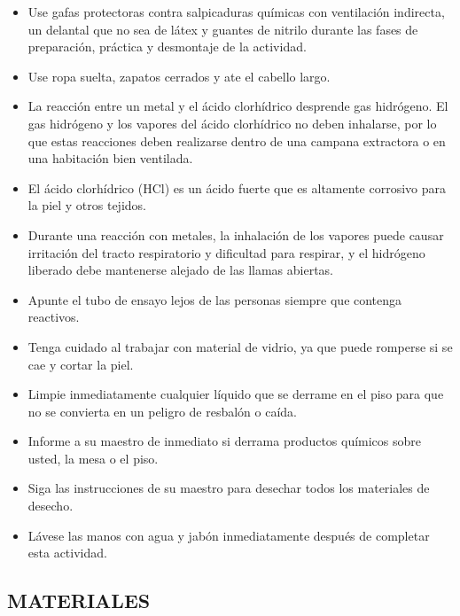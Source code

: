 \documentclass[a4paper,11pt]{exam}
\begin{document}
\begin{itemize}
 


    \item Use gafas protectoras contra salpicaduras químicas con ventilación indirecta, un delantal que no sea de látex y guantes de nitrilo durante
las fases de preparación, práctica y desmontaje de la actividad.

\item Use ropa suelta, zapatos cerrados y ate el cabello largo.

\item La reacción entre un metal y el ácido clorhídrico desprende gas hidrógeno. El gas hidrógeno
y los vapores del ácido clorhídrico no deben inhalarse, por lo que estas reacciones deben realizarse dentro de una campana extractora o en una habitación bien ventilada.

\item El ácido clorhídrico (HCl) es un ácido fuerte que es altamente corrosivo para la piel y otros tejidos.
\item Durante una reacción con metales, la inhalación de los vapores puede causar irritación del tracto respiratorio y dificultad para respirar, y el hidrógeno liberado debe mantenerse alejado de las llamas abiertas.

\item Apunte el tubo de ensayo lejos de las personas siempre que contenga reactivos.

\item Tenga cuidado al trabajar con material de vidrio, ya que puede romperse si se cae y cortar la piel.

\item Limpie inmediatamente cualquier líquido que se derrame en el piso para que no se convierta en un peligro de resbalón o caída.

\item Informe a su maestro de inmediato si derrama productos químicos sobre usted, la mesa o el piso.

\item Siga las instrucciones de su maestro para desechar todos los materiales de desecho.

\item Lávese las manos con agua y jabón inmediatamente después de completar esta actividad.


\end{itemize}


\subsection*{MATERIALES}
\end{document}
